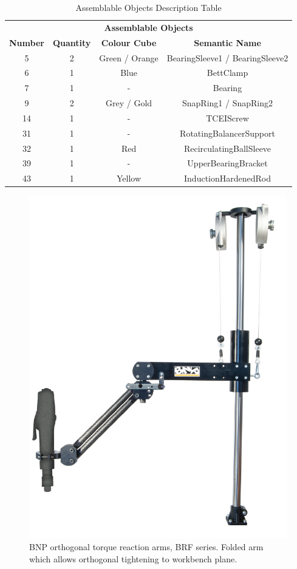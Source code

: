 \begin{table}[H]
  \centering
  \caption{Assemblable Objects Description Table}\label{tab:ass_table}
  \medskip
\renewcommand\arraystretch{1.5}
\renewcommand\tabcolsep{12pt}
\begin{tabular}{cccc}
\toprule
\multicolumn{4}{c}{\textbf{Assemblable Objects}} \\
\textbf{Number} &  \textbf{Quantity} &  \textbf{Colour Cube} &  \textbf{Semantic Name}  \\
\midrule
\rowcolor{gray!25}
5 & 2 & Green / Orange & BearingSleeve1 / BearingSleeve2 \\
6 & 1 & Blue & BettClamp \\
\rowcolor{gray!25}
7 & 1 & - & Bearing \\
9 & 2 & Grey / Gold & SnapRing1 / SnapRing2 \\
\rowcolor{gray!25}
14 & 1 & - & TCEIScrew \\
31 & 1 & - & RotatingBalancerSupport \\
\rowcolor{gray!25}
32 & 1 & Red & RecirculatingBallSleeve \\
39 & 1 & - & UpperBearingBracket \\
\rowcolor{gray!25}
43 & 1 & Yellow & InductionHardenedRod \\
\bottomrule
\end{tabular}
\end{table}

\begin{figure} [h]
\centering
\includegraphics[width=0.5
\textwidth]{figures/Magistrale/BRF}
\caption[BNP Orthogonal Torque Reaction Arms]{BNP orthogonal torque reaction arms, BRF series. Folded arm which allows orthogonal tightening to workbench plane.
\label{fig:brf}}
\end{figure} 

